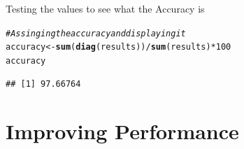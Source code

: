 \documentclass{article}\usepackage[]{graphicx}\usepackage[]{color}
\makeatletter
\newcommand{\hlnum}[1]{\textcolor[rgb]{0.686,0.059,0.569}{#1}}%
\newcommand{\hlcom}[1]{\textcolor[rgb]{0.678,0.584,0.686}{\textit{#1}}}%
\newcommand{\hlopt}[1]{\textcolor[rgb]{0,0,0}{#1}}%
\newcommand{\hlstd}[1]{\textcolor[rgb]{0.345,0.345,0.345}{#1}}%
\newcommand{\hlkwb}[1]{\textcolor[rgb]{0.69,0.353,0.396}{#1}}%
\newcommand{\hlkwd}[1]{\textcolor[rgb]{0.737,0.353,0.396}{\textbf{#1}}}%
\newenvironment{kframe}{%
 \def\at@end@of@kframe{}%
 \ifinner\ifhmode%
  \def\at@end@of@kframe{\end{minipage}}%
  \begin{minipage}{\columnwidth}%
 \fi\fi%
 \def\FrameCommand##1{\hskip\@totalleftmargin \hskip-\fboxsep
 \colorbox{shadecolor}{##1}\hskip-\fboxsep
     \hskip-\linewidth \hskip-\@totalleftmargin \hskip\columnwidth}%
 \MakeFramed {\advance\hsize-\width
   \@totalleftmargin\z@ \linewidth\hsize
   \@setminipage}}%
 {\par\unskip\endMakeFramed%
 \at@end@of@kframe}
\newenvironment{knitrout}{}{} %
\makeatother
\begin{document}
Testing the values to see what the Accuracy is
\begin{knitrout}
\color{fgcolor}\begin{kframe}
\begin{alltt}
\hlcom{#Assinging the accuracy and displaying it}
\hlstd{accuracy} \hlkwb{<-} \hlkwd{sum}\hlstd{(}\hlkwd{diag}\hlstd{(results))} \hlopt{/} \hlkwd{sum}\hlstd{(results)} \hlopt{*} \hlnum{100}
\hlstd{accuracy}
\end{alltt}
\begin{verbatim}
## [1] 97.66764
\end{verbatim}
\end{kframe}
\end{knitrout}

\section{Improving Performance}












































\end{document}
